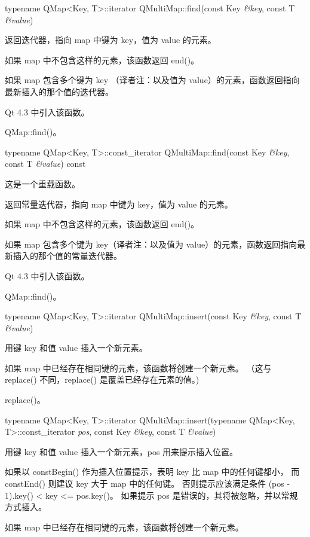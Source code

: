 typename QMap<Key, T>::iterator QMultiMap::find(const Key \emph{\&key}, const T \emph{\&value})

返回迭代器，指向 map 中键为 key，值为 value 的元素。

如果 map 中不包含这样的元素，该函数返回 end()。

如果 map 包含多个键为 key （译者注：以及值为 value）的元素，函数返回指向最新插入的那个值的迭代器。

Qt 4.3 中引入该函数。

\begin{seeAlso}
QMap::find()。
\end{seeAlso}

typename QMap<Key, T>::const\_iterator QMultiMap::find(const Key \emph{\&key}, const T \emph{\&value}) const

这是一个重载函数。

返回常量迭代器，指向 map 中键为 key，值为 value 的元素。

如果 map 中不包含这样的元素，该函数返回 end()。

如果 map 包含多个键为 key（译者注：以及值为 value）的元素，函数返回指向最新插入的那个值的常量迭代器。

Qt 4.3 中引入该函数。

\begin{seeAlso}
QMap::find()。
\end{seeAlso}

typename QMap<Key, T>::iterator QMultiMap::insert(const Key \emph{\&key}, const T \emph{\&value})

用键 key 和值 value 插入一个新元素。

如果 map 中已经存在相同键的元素，该函数将创建一个新元素。
（这与 replace() 不同，replace() 是覆盖已经存在元素的值。)

\begin{seeAlso}
replace()。
\end{seeAlso}

typename QMap<Key, T>::iterator QMultiMap::insert(typename QMap<Key, T>::const\_iterator \emph{pos}, const Key \emph{\&key}, const T \emph{\&value})

用键 key 和值 value 插入一个新元素，pos 用来提示插入位置。

如果以 constBegin() 作为插入位置提示，表明 key 比 map 中的任何键都小，
而 constEnd() 则建议 key 大于 map 中的任何键。
否则提示应该满足条件 (pos - 1).key() < key <= pos.key()。
如果提示 pos 是错误的，其将被忽略，并以常规方式插入。

如果 map 中已经存在相同键的元素，该函数将创建一个新元素。

